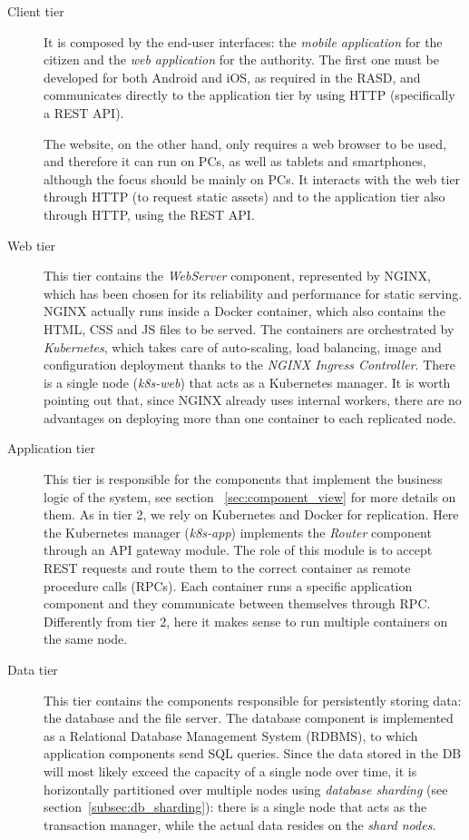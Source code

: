 \begin{description}
    \item[Client tier] It is composed by the end-user interfaces:
    the \emph{mobile application} for the citizen and the \emph{web application}
    for the authority.
    The first one must be developed for both Android and iOS, as required in
    the RASD, and communicates directly to the application tier by using
    HTTP (specifically a REST API).

    The website, on the other hand, only requires a web browser to be used,
    and therefore it can run on PCs, as well as tablets and smartphones,
    although the focus should be mainly on PCs.
    It interacts with the web tier through HTTP (to request static assets)
    and to the application tier also through HTTP, using the REST API.
    \item[Web tier] This tier contains the \emph{WebServer} component,
    represented by NGINX, which has been chosen for its reliability and
    performance for static serving.
    NGINX actually runs inside a Docker container, which also contains the HTML,
    CSS and JS files to be served. The containers are orchestrated by
    \emph{Kubernetes}, which takes care of auto-scaling, load balancing, image
    and configuration deployment thanks to the \emph{NGINX Ingress Controller}.
    There is a single node (\emph{k8s-web}) that acts as a Kubernetes manager.
    It is worth pointing out that, since NGINX already uses internal workers,
    there are no advantages on deploying more than one container to each
    replicated node.
    \item[Application tier] This tier is responsible for the components that
    implement the business logic of the system, see section~%
    \ref{sec:component_view} for more details on them.
    As in tier 2, we rely on Kubernetes and Docker for replication.
    Here the Kubernetes manager (\emph{k8s-app}) implements the \emph{Router}
    component through an API gateway module.
    The role of this module is to accept REST requests and route them to
    the correct container as remote procedure calls (RPCs).
    Each container runs a specific application component and they communicate
    between themselves through RPC. Differently from tier 2, here it makes sense
    to run multiple containers on the same node.
    \item[Data tier] This tier contains the components responsible for
    persistently storing data: the database and the file server.
    The database component is implemented as a Relational Database Management
    System (RDBMS), to which application components send SQL queries.
    Since the data stored in the DB will most likely exceed the capacity of a
    single node over time, it is horizontally partitioned over multiple nodes
    using \emph{database sharding} (see section~\ref{subsec:db_sharding}):
    there is a single node that acts as the transaction manager, while the
    actual data resides on the \emph{shard nodes}.


\end{description}
